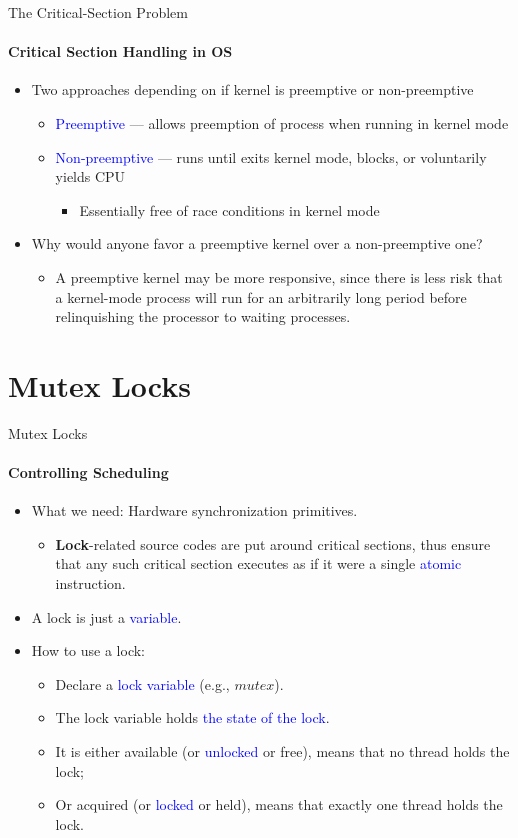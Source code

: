 \documentclass[10pt]{beamer}
\begin{document}
\begin{frame}{The Critical-Section Problem}
\framesubtitle{Critical Section Handling in OS}
\begin{itemize}
 
\item Two approaches depending on if kernel is preemptive or non-preemptive
\begin{itemize}
\item \textcolor{blue}{Preemptive} --- allows preemption of process when running in kernel mode
\item \textcolor{blue}{Non-preemptive} --- runs until exits kernel mode, blocks, or voluntarily yields CPU
\begin{itemize}
\item Essentially free of race conditions in kernel mode
\end{itemize}
\end{itemize}
\item Why would anyone favor a preemptive kernel over a non-preemptive one?
\begin{itemize}
\item A preemptive kernel may be more responsive, since there is less risk that a kernel-mode process will run for an arbitrarily long period before relinquishing the processor to waiting processes. 
\end{itemize}
\end{itemize}
\end{frame}

\section[3.Mutex]{Mutex Locks}
\begin{frame}{Mutex Locks}
\framesubtitle{Controlling Scheduling}
\begin{itemize}
 
\item What we need: \alert{Hardware synchronization primitives}.
\begin{itemize}
\item \textbf{\alert{Lock}}-related source codes are put around critical sections, thus ensure that any such critical section executes as if it were a single \textcolor{blue}{atomic} instruction.
\end{itemize}
\item A lock is just a \textcolor{blue}{variable}.
\item How to use a lock:
\begin{itemize}
\item Declare a \textcolor{blue}{lock variable} (e.g., $mutex$).
\item The lock variable holds \textcolor{blue}{the state of the lock}.
\item It is either available (or \textcolor{blue}{unlocked} or free), means that no thread holds the lock;
\item Or acquired (or \textcolor{blue}{locked} or held), means that exactly one thread holds the lock.
\end{itemize}
\end{itemize}
\end{frame}
\end{document}
